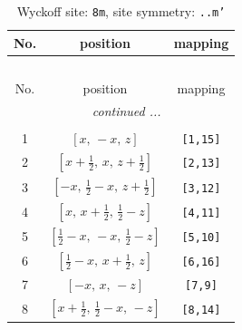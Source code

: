 \documentclass[fleqn,8pt]{jsarticle}
\begin{document}
\begin{longtable}{ccc}
\caption{Wyckoff site: {\tt 8m}, site symmetry: {\tt ..m'}}
 \\
 \hline \hline
No. & position & mapping \\ \hline \endfirsthead

\multicolumn{2}{l}{\tablename\ \thetable{}} \\
 \hline \hline
No. & position & mapping \\ \hline \endhead

 \hline \hline
\multicolumn{2}{r}{\footnotesize\it continued ...} \\ \endfoot

 \hline \hline
\multicolumn{2}{r}{} \\ \endlastfoot

1 & $\left[ x,\, - x,\, z \right]$ & {\tt [1,15]} \\ \hline
2 & $\left[ x + \frac{1}{2},\, x,\, z + \frac{1}{2} \right]$ & {\tt [2,13]} \\ \hline
3 & $\left[ - x,\, \frac{1}{2} - x,\, z + \frac{1}{2} \right]$ & {\tt [3,12]} \\ \hline
4 & $\left[ x,\, x + \frac{1}{2},\, \frac{1}{2} - z \right]$ & {\tt [4,11]} \\ \hline
5 & $\left[ \frac{1}{2} - x,\, - x,\, \frac{1}{2} - z \right]$ & {\tt [5,10]} \\ \hline
6 & $\left[ \frac{1}{2} - x,\, x + \frac{1}{2},\, z \right]$ & {\tt [6,16]} \\ \hline
7 & $\left[ - x,\, x,\, - z \right]$ & {\tt [7,9]} \\ \hline
8 & $\left[ x + \frac{1}{2},\, \frac{1}{2} - x,\, - z \right]$ & {\tt [8,14]} \\
\end{longtable}
\renewcommand{\arraystretch}{1.2}
\end{document}

